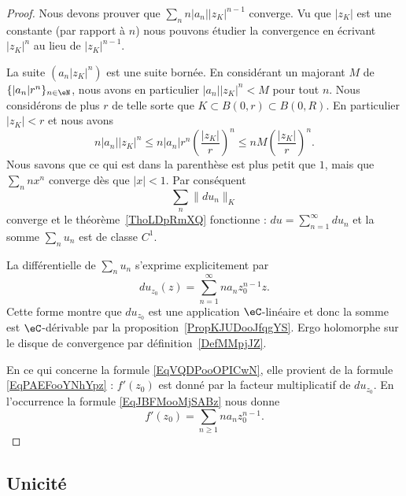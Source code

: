 \begin{proof}
	Nous devons prouver que \( \sum_nn| a_n | |z_K |^{n-1}\) converge. Vu que \( | z_K |\) est une constante (par rapport à \( n\)) nous pouvons étudier la convergence en écrivant \( | z_K |^n\) au lieu de \( | z_K |^{n-1}\).

	La suite \( (a_n| z_K |^n)\) est une suite bornée. En considérant un majorant \( M\) de \( \{ | a_n |r^n \}_{n\in \eN}\), nous avons en particulier \( | a_n | |z_K |^n<M\) pour tout \( n\). Nous considérons de plus \( r\) de telle sorte que \( K\subset B(0,r)\subset B(0,R)\). En particulier \( | z_K |<r\) et nous avons
	\begin{equation}
		n| a_n | |z_K |^n\leq n| a_n |r^n\left( \frac{ | z_K | }{ r } \right)^n\leq nM\left( \frac{ | z_K | }{ r } \right)^n.
	\end{equation}
	Nous savons que ce qui est dans la parenthèse est plus petit que \( 1\), mais que \( \sum_nnx^n\) converge dès que \( | x |<1\). Par conséquent
	\begin{equation}
		\sum_n\| du_n \|_K
	\end{equation}
	converge et le théorème~\ref{ThoLDpRmXQ} fonctionne : \( du=\sum_{n=1}^{\infty}du_n\) et la somme \( \sum_nu_n\) est de classe \( C^1\).

	La différentielle de \( \sum_nu_n\) s'exprime explicitement par
	\begin{equation}        \label{EqJBFMooMjSABz}
		du_{z_0}(z)=\sum_{n=1}^{\infty}na_nz_0^{n-1}z.
	\end{equation}
	Cette forme montre que \( du_{z_0}\) est une application \( \eC\)-linéaire et donc la somme est \( \eC\)-dérivable par la proposition~\ref{PropKJUDooJfqgYS}. Ergo holomorphe sur le disque de convergence par définition~\ref{DefMMpjJZ}.

	En ce qui concerne la formule \eqref{EqVQDPooOPICwN}, elle provient de la formule \eqref{EqPAEFooYNhYpz} : \( f'(z_0)\) est donné par la facteur multiplicatif de \( du_{z_0}\). En l'occurrence la formule \eqref{EqJBFMooMjSABz} nous donne
	\begin{equation}
		f'(z_0)=\sum_{n\geq 1}na_nz_0^{n-1}.
	\end{equation}
\end{proof}


\subsection{Unicité}


